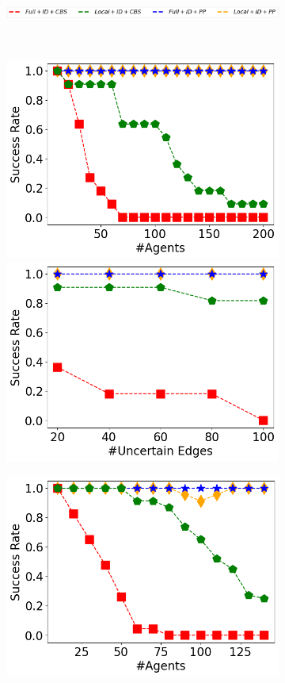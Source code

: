 \documentclass[letterpaper]{article} %
\def\
UrlFont{\rm}  %
\theoremstyle{definition}
\begin{document}
\begin{figure}[tbh]
    \begin{subfigure}[b]{0.9\columnwidth}\centering
      \includegraphics[width=\columnwidth]{Figures/legends_success_rates.png}
    \end{subfigure}\\
        \begin{subfigure}[b]{\columnwidth}\centering
      \includegraphics[width=0.47\columnwidth]{Figures/maze/mixed_small_figures/Success-Rate(k)_pos=100_ID_ONLY.png}
      \includegraphics[width=0.47\columnwidth]{Figures/maze/mixed_small_figures/Success-Rate(UEs)_k=50_ID_ONLY.png}
    \end{subfigure}
    \begin{subfigure}[b]{\columnwidth}\centering
      \includegraphics[width=0.47\columnwidth]{Figures/warehouse/mixed_small_figures/Success-Rate(k)_pos=100_ID_ONLY.png}

\end{subfigure}
\end{figure}
\end{document}
